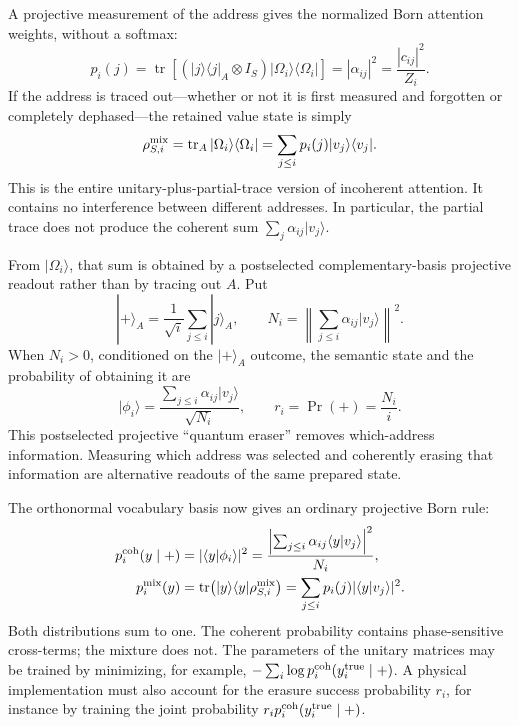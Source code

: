 \documentclass[
  aps,
  reprint,
  superscriptaddress,
  floatfix,
  nofootinbib,
  longbibliography
]{revtex4-2}
\begin{document}
A projective measurement of the address gives the normalized Born attention
weights, without a softmax:
\begin{equation}
 p_i(j)
 =\operatorname{tr}\!\left[
 (|j\rangle\langle j|_A\otimes I_S)
 |\Omega_i\rangle\langle\Omega_i|
 \right]
 =|\alpha_{ij}|^2
 =\frac{|c_{ij}|^2}{Z_i}.
\label{eq:uta-address}
\end{equation}
If the address is traced out---whether or not it is first measured and
forgotten or completely dephased---the retained value state is simply
\begin{equation}
 \rho_{S,i}^{\rm mix}
 =\operatorname{tr}_A|\Omega_i\rangle\langle\Omega_i|
 =\sum_{j\leq i}p_i(j)|v_j\rangle\langle v_j|.
\label{eq:uta-mixture}
\end{equation}
This is the entire unitary-plus-partial-trace version of incoherent
attention.  It contains no interference between different addresses.  In
particular, the partial trace does not produce the coherent sum
$\sum_j\alpha_{ij}|v_j\rangle$.

From $|\Omega_i\rangle$, that sum is obtained by a postselected
complementary-basis projective readout rather than by tracing out $A$.  Put
\begin{equation}
 |+\rangle_A=\frac{1}{\sqrt{i}}\sum_{j\leq i}|j\rangle_A,\qquad
 N_i=\left\|\sum_{j\leq i}\alpha_{ij}|v_j\rangle\right\|^2 .
\label{eq:uta-erasure}
\end{equation}
When $N_i>0$, conditioned on the $|+\rangle_A$ outcome, the semantic state and the
probability of obtaining it are
\begin{equation}
 |\phi_i\rangle
 =\frac{\sum_{j\leq i}\alpha_{ij}|v_j\rangle}{\sqrt{N_i}},
 \qquad
 r_i=\Pr(+)=\frac{N_i}{i}.
\label{eq:uta-coherent}
\end{equation}
This postselected projective ``quantum eraser'' removes which-address information.
Measuring which address was selected and coherently erasing that information
are alternative readouts of the same prepared state.

The orthonormal vocabulary basis now gives an ordinary projective Born rule:
\begin{equation}
\begin{aligned}
 p_i^{\rm coh}(y\mid +)
 &=|\langle y|\phi_i\rangle|^2
 =\frac{\left|\sum_{j\leq i}
       \alpha_{ij}\langle y|v_j\rangle\right|^2}{N_i},\\
 p_i^{\rm mix}(y)
 &=\operatorname{tr}\!\left(
 |y\rangle\langle y|\rho_{S,i}^{\rm mix}\right)
 =\sum_{j\leq i}p_i(j)|\langle y|v_j\rangle|^2 .
\end{aligned}
\label{eq:uta-vocabulary}
\end{equation}
Both distributions sum to one.  The coherent probability contains
phase-sensitive cross-terms; the mixture does not.  The parameters of the
unitary matrices may be trained by minimizing, for example,
$-\sum_i\log p_i^{\rm coh}(y_i^{\rm true}\mid +)$.  A physical implementation
must also account for the erasure success probability $r_i$, for instance by
training the joint probability $r_i p_i^{\rm coh}(y_i^{\rm true}\mid +)$.
\end{document}
